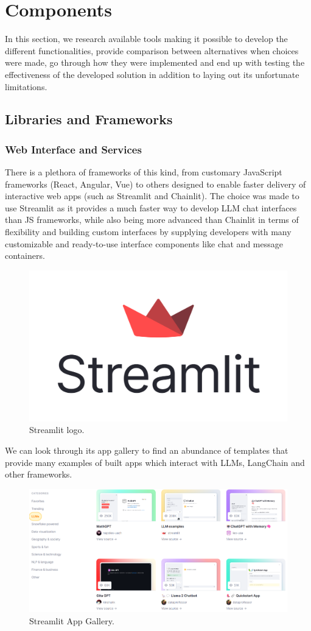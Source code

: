 \section{Components}
In this section, we research available tools making it possible to develop the different functionalities, provide comparison between alternatives when choices were made, go through how they were implemented and end up with testing the effectiveness of the developed solution in addition to laying out its unfortunate limitations.
\subsection{Libraries and Frameworks}
\subsubsection*{Web Interface and Services}
There is a plethora of frameworks of this kind, from customary JavaScript frameworks (React, Angular, Vue) to others designed to enable faster delivery of interactive web apps (such as Streamlit and Chainlit).\newline
The choice was made to use Streamlit as it provides a much faster way to develop LLM chat interfaces than JS frameworks, while also being more advanced than Chainlit in terms of flexibility and building custom interfaces by supplying developers with many customizable and ready-to-use interface components like chat and message containers.
\begin{figure}[H]
    \centering
    \includegraphics[width=.5\linewidth]{./figures/streamlit-logo.png}
    \caption{Streamlit logo.}
\end{figure}
We can look through its app gallery to find an abundance of templates that provide many examples of built apps which interact with LLMs, LangChain and other frameworks.
\begin{figure}[H]
    \centering
    \includegraphics[width=\linewidth]{./figures/streamlit-app-gallery.png}
    \caption{Streamlit App Gallery.}
\end{figure}

